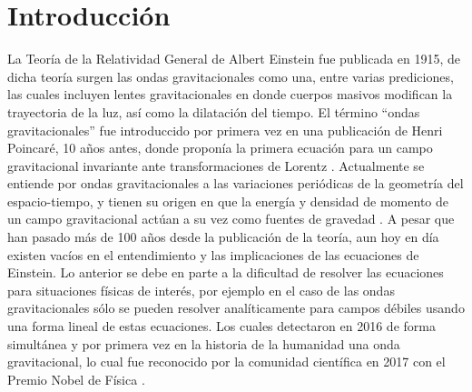 
%


\newcommand{\keyword}[1]{\textit{#1}}


\section{Introducción}
	La Teor\'ia de la Relatividad General de Albert Einstein fue publicada en 1915, de dicha teor\'ia surgen las ondas gravitacionales como una, entre varias prediciones, las cuales incluyen lentes gravitacionales en donde cuerpos masivos modifican la trayectoria de la luz, as\'i como la dilataci\'on del tiempo. El t\'ermino ``ondas gravitacionales'' fue introduccido por primera vez en una publicaci\'on de Henri Poincaré, 10 a\~nos antes, donde propon\'ia la primera ecuaci\'on para un campo gravitacional invariante ante transformaciones de Lorentz \cite{straumann2012general, bassan2014advanced}. Actualmente se entiende por ondas gravitacionales a las variaciones periódicas de la geometría del espacio-tiempo, y tienen su origen en que la energía y densidad de momento de un campo gravitacional actúan a su vez como fuentes de gravedad \cite{hoyng2006gravitational}. A pesar que han pasado más de 100 años desde la publicación de la teoría, aun hoy en día existen vacíos en el entendimiento y las implicaciones de las ecuaciones de Einstein. Lo anterior se debe en parte a la dificultad de resolver las ecuaciones para situaciones físicas de interés, por ejemplo en el caso de las ondas gravitacionales sólo se pueden resolver analíticamente para campos débiles usando una forma lineal de estas ecuaciones. Los cuales detectaron en 2016 de forma simultánea y por primera vez en la historia de la humanidad una onda gravitacional, lo cual fue reconocido por la comunidad científica en 2017 con el Premio Nobel de Física \cite{brugmann2018fundamentals}.  
	
